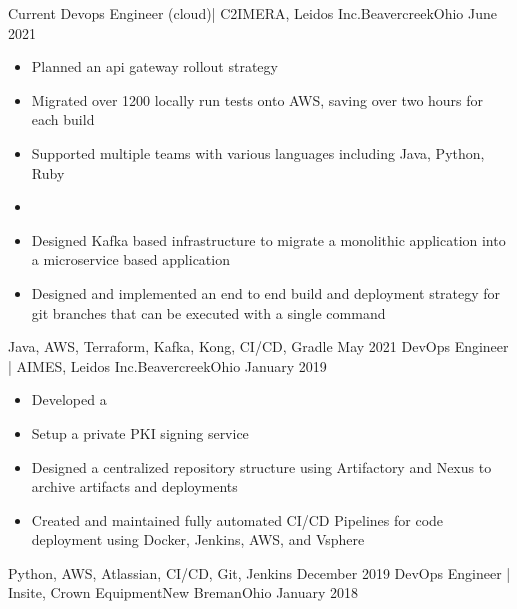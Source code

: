 %
%
%
\begin{experiences}

  \experience
    {Current}   {Devops Engineer (cloud)| C2IMERA, Leidos Inc.}{Beavercreek}{Ohio}
    {June 2021} {
      \begin{itemize}
        \item Planned an api gateway rollout strategy
        \item Migrated over 1200 locally run tests onto AWS, saving over two hours for each build
        \item Supported multiple teams with various languages including Java, Python, Ruby
        \item
        \item Designed Kafka based infrastructure to migrate a monolithic application into a microservice based application
        \item Designed and implemented an end to end build and deployment strategy for git branches that can be executed with a single command

      \end{itemize}
    }
    {Java, AWS, Terraform, Kafka, Kong, CI/CD, Gradle}
  \emptySeparator
  \experience
    {May 2021}   {DevOps Engineer | AIMES, Leidos Inc.}{Beavercreek}{Ohio}
    {January 2019} {
      \begin{itemize}
          \item Developed a
          \item Setup a private PKI signing service
          \item Designed a centralized repository structure using Artifactory and Nexus to archive artifacts and deployments
          \item Created and maintained fully automated CI/CD Pipelines for code deployment using Docker, Jenkins, AWS, and Vsphere
      \end{itemize}
    }
    {Python, AWS, Atlassian, CI/CD, Git, Jenkins}
  \emptySeparator
  \experience
    {December 2019}   {DevOps Engineer | Insite, Crown Equipment}{New Breman}{Ohio}
    {January 2018} {
      \begin{itemize}


\end{itemize}}
\end{experiences}
